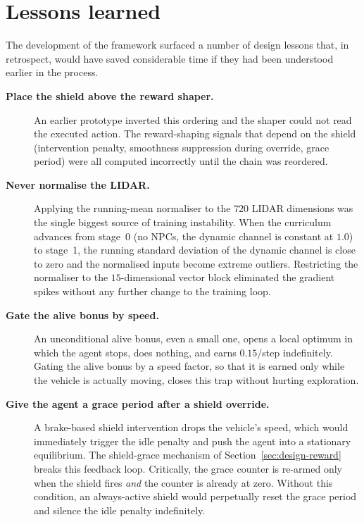 \section{Lessons learned}\label{sec:concl-lessons}

The development of the framework surfaced a number of design lessons that, in retrospect, would
have saved considerable time if they had been understood earlier in the process.

\begin{description}
  \item[\textbf{Place the shield above the reward shaper.}] An earlier prototype inverted this
        ordering and the shaper could not read the executed action. The reward-shaping signals
        that depend on the shield (intervention penalty, smoothness suppression during
        override, grace period) were all computed incorrectly until the chain was reordered.
  \item[\textbf{Never normalise the LIDAR.}] Applying the running-mean normaliser to the
        \(720\) LIDAR dimensions was the single biggest source of training instability.
        When the curriculum advances from stage~0 (no NPCs, the dynamic channel is constant at
        \(1.0\)) to stage~1, the running standard deviation of the dynamic channel is close to
        zero and the normalised inputs become extreme outliers. Restricting the normaliser to
        the \(15\)-dimensional vector block eliminated the gradient spikes without any further
        change to the training loop.
  \item[\textbf{Gate the alive bonus by speed.}] An unconditional alive bonus, even a small one,
        opens a local optimum in which the agent stops, does nothing, and earns
        \(0.15\)/step indefinitely. Gating the alive bonus by a speed factor, so that it is
        earned only while the vehicle is actually moving, closes this trap without
        hurting exploration.
  \item[\textbf{Give the agent a grace period after a shield override.}] A brake-based shield
        intervention drops the vehicle's speed, which would immediately trigger the idle penalty
        and push the agent into a stationary equilibrium. The shield-grace mechanism of
        Section~\ref{sec:design-reward} breaks this feedback loop. Critically, the grace counter
        is re-armed only when the shield fires \emph{and} the counter is already at zero.
        Without this condition, an always-active shield would perpetually reset the grace period
        and silence the idle penalty indefinitely.

\end{description}
